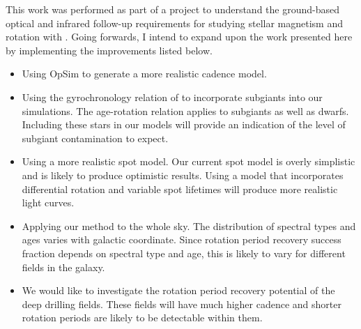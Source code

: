 This work was performed as part of a project to understand the ground-based
optical and infrared follow-up requirements for studying stellar magnetism and
rotation with \LSST.
Going forwards, I intend to expand upon the work presented here by
implementing the improvements listed below.
\begin{itemize}
\item{Using OpSim to generate a more realistic cadence model.}
\item{Using the gyrochronology relation of \citet{Vansaders2013} to
incorporate subgiants into our simulations.
The \citet{Vansaders2013} age-rotation relation applies to subgiants as well
as dwarfs.
Including these stars in our models will provide an indication of the level of
subgiant contamination to expect.}
\item{Using a more realistic spot model.
Our current spot model is overly simplistic and is likely to produce
optimistic results.
Using a model that incorporates differential rotation and variable spot
lifetimes will produce more realistic light curves.}
\item{Applying our method to the whole sky.
The distribution of spectral types and ages varies with galactic coordinate.
Since rotation period recovery success fraction depends on spectral type and
age, this is likely to vary for different fields in the galaxy.}
\item{We would like to investigate the rotation period recovery potential of
the deep drilling fields.
These fields will have much higher cadence and shorter rotation periods are
likely to be detectable within them.}
\end{itemize}
